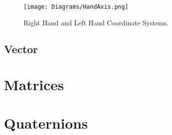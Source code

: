 \begin{figure}[htbp]
	\raggedright
	{\centering
		\vspace{7px}
		\texttt{[image: Diagrams/HandAxis.png]}
		\caption{Right Hand and Left Hand Coordinate Systems.}
		\label{3DAxisFigure}
	}
\end{figure}
\FloatBarrier

\subsection{Vector}


\section{Matrices}

\section{Quaternions}

